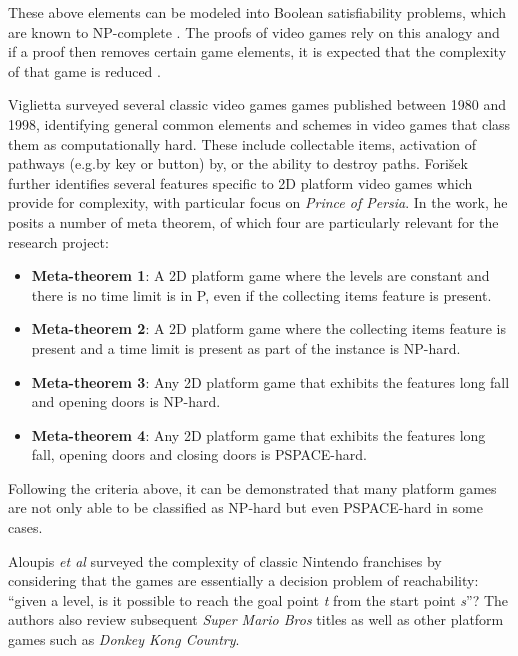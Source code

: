 \documentclass[11pt, a4paper, oneside]{report} %
\begin{document}
These above elements can be modeled into Boolean satisfiability problems, which
are known to NP-complete \cite{DBLP:conf/fun/Forisek10, cook1971complexity}.
The proofs of video games rely on this analogy and if a proof then removes
certain game elements, it is expected that the complexity of that game is
reduced \cite{viglietta2014gaming}.

Viglietta \cite{viglietta2014gaming} surveyed several classic video games games
published between 1980 and 1998, identifying general common elements and schemes
in video games that class them as computationally hard. These include
collectable items, activation of pathways (e.g.by key or button) by, or the
ability to destroy paths. Fori\v{s}ek \@\cite{DBLP:conf/fun/Forisek10} further
identifies several features specific to 2D platform video games which provide
for complexity, with particular focus on \textit{Prince of Persia}. In the work,
he posits a number of meta theorem, of which four are particularly relevant for
the research project:

\begin{itemize}

  \item \textbf{Meta-theorem 1}: A 2D platform game where the levels are constant and there is no
                                time limit is in P, even if the collecting items feature is present.

  \item \textbf{Meta-theorem 2}: A 2D platform game where the collecting items feature is present
                                 and a time limit is present as part of the instance is NP-hard.

  \item \textbf{Meta-theorem 3}: Any 2D platform game that exhibits the features long fall and
                                 opening doors is NP-hard.

  \item \textbf{Meta-theorem 4}: Any 2D platform game that exhibits the features long fall, opening
                                 doors and closing doors is PSPACE-hard.

\end{itemize}


Following the criteria above, it can be demonstrated that many platform games
are not only able to be classified as NP-hard but even PSPACE-hard in some
cases.

Aloupis \textit{et al} \cite{Aloupis2012} surveyed the complexity of classic
Nintendo franchises by considering that the games are essentially a decision
problem of reachability: ``given a level, is it possible to reach the goal point
\textit{t} from the start point \textit{s}''? The authors also review subsequent
\textit{Super Mario Bros} titles as well as other platform games such as
\textit{Donkey Kong Country}.
\end{document}
